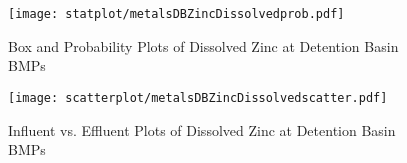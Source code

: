         \begin{figure}[hb]   %
            \centering
            \texttt{[image: statplot/metalsDBZincDissolvedprob.pdf]}
            \caption{Box and Probability Plots of Dissolved Zinc at Detention Basin BMPs}
        \end{figure}         %
        
        
        \begin{figure}[hb]   %
            \centering
            \texttt{[image: scatterplot/metalsDBZincDissolvedscatter.pdf]}
            \caption{Influent vs. Effluent Plots of Dissolved Zinc at Detention Basin BMPs}
        \end{figure}         %
        \clearpage
        